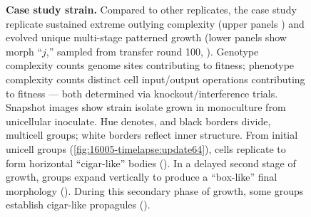 \begin{figure}
\caption{%
\textbf{Case study strain.}
\footnotesize
Compared to other replicates, the case study replicate sustained extreme outlying complexity (upper panels ) and evolved unique multi-stage patterned growth (lower panels show morph ``$j$,'' sampled from transfer round 100, ).
Genotype complexity counts genome sites contributing to fitness; phenotype complexity counts distinct cell input/output operations contributing to fitness --- both determined via knockout/interference trials.
Snapshot images show strain isolate grown in monoculture from unicellular inoculate.
Hue denotes, and black borders divide, multicell groups; white borders reflect inner structure.
From initial unicell groups (\ref{fig:16005-timelapse:update64}), cells replicate to form horizontal ``cigar-like'' bodies ().
In a delayed second stage of growth, groups expand vertically to produce a ``box-like'' final morphology ().
During this secondary phase of growth, some groups establish cigar-like propagules ().
}
\label{fig:16005-timelapse}

\end{figure}
